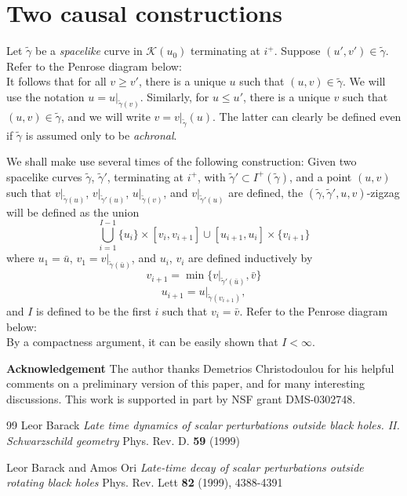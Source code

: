 \documentclass{article}
\begin{document}
{\appendix                               

\section{Two causal constructions}
Let $\tilde{\gamma}$ be a \emph{spacelike} curve in $\mathcal{K}(u_0)$ terminating
at $i^+$. Suppose $(u',v')\in\tilde{\gamma}$. 
Refer to the Penrose diagram below:
\[

\]
It follows that for
all $v\ge v'$, there is a unique $u$ such that $(u,v)\in\tilde{\gamma}$.
We will use the notation $u=u|_{\tilde{\gamma}(v)}$.
Similarly, for $u\le u'$, there is a unique $v$ such that
$(u,v)\in\tilde{\gamma}$, and we will write
$v=v|_{\tilde\gamma}(u)$. The latter can clearly be defined
even if $\tilde\gamma$ is assumed only to be \emph{achronal}.


We shall make use several times of the following construction:
Given two spacelike curves $\tilde\gamma$, $\tilde\gamma'$, terminating
at $i^+$, with
$\tilde\gamma'\subset I^+(\tilde\gamma)$, and a point $(u,v)$ 
such that $v|_{\tilde\gamma(u)}$, $v|_{\tilde\gamma'(u)}$, 
$u|_{\tilde\gamma(v)}$, and $v|_{\tilde\gamma'(u)}$ are defined,
the $(\tilde\gamma,\tilde\gamma',u,v)$-zigzag will be defined
as the union
\[
\bigcup_{i=1}^{I-1}\{u_i\}\times[v_i,v_{i+1}]\cup[u_{i+1},u_i]\times\{v_{i+1}\}
\]
where $u_1=\bar{u}$, $v_1=v|_{\tilde\gamma(\bar{u})}$,
and $u_i$, $v_i$ are defined inductively by
\[
v_{i+1}=\min\{v|_{\tilde\gamma'(\bar{u})},\bar{v}\}
\]
\[
u_{i+1}=u|_{\tilde\gamma(v_{i+1})},
\]
and $I$ is defined to be the first $i$ such that $v_i=\bar{v}$.
Refer to the Penrose diagram below:
\[

\]
By a compactness argument, it can be easily shown that $I<\infty$.

\vskip1pc
\noindent
{\bf Acknowledgement}
The author thanks Demetrios Christodoulou for his helpful comments
on a preliminary version of this paper, and for many interesting
discussions. This work is supported in part by
NSF grant  DMS-0302748.


\frenchspacing

\begin{thebibliography}{99}
 Leor Barack \emph{Late time dynamics of scalar perturbations
outside black holes. II. Schwarzschild geometry} Phys. Rev. D. {\bf 59}
(1999)

 Leor Barack and Amos Ori \emph{Late-time decay
of scalar perturbations outside rotating black holes}
Phys. Rev. Lett {\bf 82} (1999), 4388-4391


\end{thebibliography}}
\end{document}
